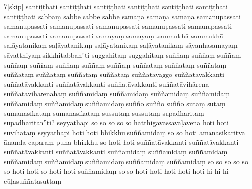 \documentclass[12pt]{article}
\begin{document}
\begin{multicols}{7}[skip]
santiṭṭhati
santiṭṭhati
santiṭṭhati
santiṭṭhati
santiṭṭhati
santiṭṭhati
santiṭṭhati
sabbaṃ
sabbe
sabbe
sabbe
samaṇā
samaṇā
samaṇā
samanupassati
samanupassati
samanupassati
samanupassati
samanupassati
samanupassati
samanupassati
samanupassati
samayaṃ
samayaṃ
sammukhā
sammukhā
saḷāyatanikaṃ
saḷāyatanikaṃ
saḷāyatanikaṃ
saḷāyatanikaṃ
sāyanhasamayaṃ
sāvatthiyaṃ
sikkhitabban”ti
suggahitaṃ
suggahitaṃ
suññaṃ
suññaṃ
suññaṃ
suññaṃ
suññaṃ
suññaṃ
suññaṃ
suññaṃ
suññataṃ
suññataṃ
suññataṃ
suññataṃ
suññataṃ
suññataṃ
suññataṃ
suññatavaggo
suññatāvakkanti
suññatāvakkanti
suññatāvakkanti
suññatāvakkanti
suññatāvihārena
suññatāvihārenāhaṃ
suññamidaṃ
suññamidaṃ
suññamidaṃ
suññamidaṃ
suññamidaṃ
suññamidaṃ
suññamidaṃ
suñño
suñño
suñño
sutaṃ
sutaṃ
sumanasikataṃ
sumanasikataṃ
sussutaṃ
sussutaṃ
sūpadhāritaṃ
sūpadhāritan”ti?
seyyathāpi
so
so
so
so
so
hatthigavassavaḷavena
hoti
hoti
suvihataṃ
seyyathāpi
hoti
hoti
bhikkhu
suññamidaṃ
so
so
hoti
amanasikaritvā
ānanda
caparaṃ
puna
bhikkhu
so
hoti
hoti
suññatāvakkanti
suññatāvakkanti
suññatāvakkanti
suññatāvakkanti
suññamidaṃ
suññamidaṃ
suññamidaṃ
suññamidaṃ
suññamidaṃ
suññamidaṃ
suññamidaṃ
suññamidaṃ
so
so
so
so
so
so
hoti
hoti
so
hoti
hoti
suññamidaṃ
so
so
hoti
hoti
hoti
hoti
hoti
hi
hi
hi
cūḷasuññatasuttaṃ
\end{multicols}
\end{document}

